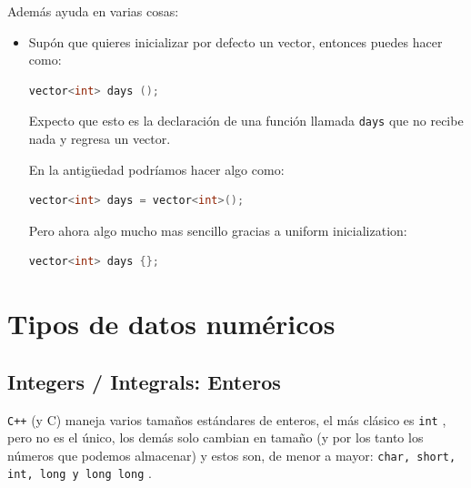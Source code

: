 \documentclass[12pt, fleqn]{report}                             %
\theoremstyle{break}                                            %
\newcommand{\textCode}[1]  { \texttt{#1} }                      %
\newcommand{\Cpp}{\ignorespaces\textCode{C++}}                  %
\begin{document}
                    Además ayuda en varias cosas:
                    \begin{itemize}
                        \item 
                            Supón que quieres inicializar por defecto un vector, entonces puedes hacer como:
                            \begin{lstlisting}[language=C++, gobble=32]
                                vector<int> days ();   
                            \end{lstlisting}

                            Expecto que esto es la declaración de una función llamada \textCode{days} que no 
                            recibe nada y regresa un vector.

                            En la antigüedad podríamos hacer algo como:
                            \begin{lstlisting}[language=C++, gobble=32]
                                vector<int> days = vector<int>();   
                            \end{lstlisting}

                            Pero ahora algo mucho mas sencillo gracias a uniform inicialization:
                            \begin{lstlisting}[language=C++, gobble=32]
                                vector<int> days {};   
                            \end{lstlisting}

                    \end{itemize}

        \clearpage
        \section{Tipos de datos numéricos}

            \subsection{Integers / Integrals: Enteros}

                \Cpp (y C) maneja varios tamaños estándares de enteros, el más clásico
                es \textCode{int}, pero no es el único, los demás solo cambian en tamaño
                (y por los tanto los números que podemos almacenar)
                y estos son, de menor a mayor: \textCode{char, short, int, long y long long}.
\end{document}
